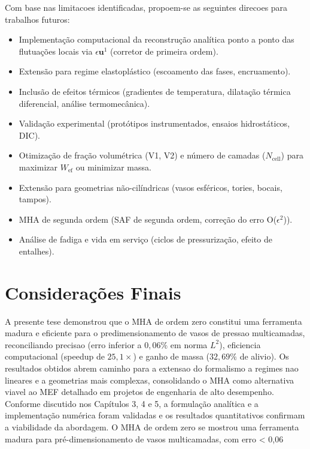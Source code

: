Com base nas limitacoes identificadas, propoem-se as seguintes direcoes para trabalhos futuros:
\begin{itemize}
\item Implementação computacional da reconstrução analítica ponto a ponto das flutuações locais via $\epsilon \mathbf{u}^1$ (corretor de primeira ordem).
\item Extensão para regime elastoplástico (escoamento das fases, encruamento).
\item Inclusão de efeitos térmicos (gradientes de temperatura, dilatação térmica diferencial, análise termomecânica).
\item Validação experimental (protótipos instrumentados, ensaios hidrostáticos, DIC).
\item Otimização de fração volumétrica (V1, V2) e número de camadas ($N_{\text{cell}}$) para maximizar $W_{\text{ef}}$ ou minimizar massa.
\item Extensão para geometrias não-cilíndricas (vasos esféricos, tories, bocais, tampos).
\item MHA de segunda ordem (SAF de segunda ordem, correção do erro O($\epsilon^2$)).
\item Análise de fadiga e vida em serviço (ciclos de pressurização, efeito de entalhes).
\end{itemize}

\section{Considerações Finais}\label{sec:conclusao_finais}

A presente tese demonstrou que o MHA de ordem zero constitui uma ferramenta madura e eficiente para o predimensionamento de vasos de pressao multicamadas, reconciliando precisao (erro inferior a $0{,}06\%$ em norma $L^2$), eficiencia computacional (speedup de $25{,}1\times$) e ganho de massa ($32{,}69\%$ de alivio). Os resultados obtidos abrem caminho para a extensao do formalismo a regimes nao lineares e a geometrias mais complexas, consolidando o MHA como alternativa viavel ao MEF detalhado em projetos de engenharia de alto desempenho. Conforme discutido nos Capítulos 3, 4 e 5, a formulação analítica e a implementação numérica foram validadas e os resultados quantitativos confirmam a viabilidade da abordagem.
O MHA de ordem zero se mostrou uma ferramenta madura para pré-dimensionamento de vasos multicamadas,
com erro < 0,06%
